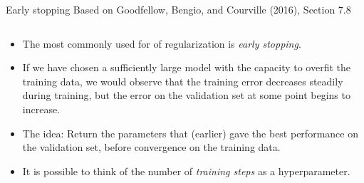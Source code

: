 \documentclass[
  10pt,
  ignorenonframetext,
]{beamer}
\providecommand{\tightlist}{%
  \setlength{\itemsep}{0pt}\setlength{\parskip}{0pt}}
\begin{document}
\begin{frame}
\begin{block}{Early stopping}
\protect\hypertarget{early-stopping}{}
\tiny Based on Goodfellow, Bengio, and Courville (2016), Section 7.8

\normalsize

\(~\)

\begin{itemize}
\tightlist
\item
  The most commonly used for of regularization is \emph{early stopping}.
\end{itemize}

\vspace{2mm}

\begin{itemize}
\tightlist
\item
  If we have chosen a sufficiently large model with the capacity to
  overfit the training data, we would observe that the training error
  decreases steadily during training, but the error on the validation
  set at some point begins to increase.
\end{itemize}

\vspace{2mm}

\begin{itemize}
\tightlist
\item
  The idea: Return the parameters that (earlier) gave the best
  performance on the validation set, before convergence on the training
  data.
\end{itemize}

\vspace{2mm}

\begin{itemize}
\tightlist
\item
  It is possible to think of the number of \emph{training steps} as a
  hyperparameter.
\end{itemize}
\end{block}
\end{frame}
\end{document}
